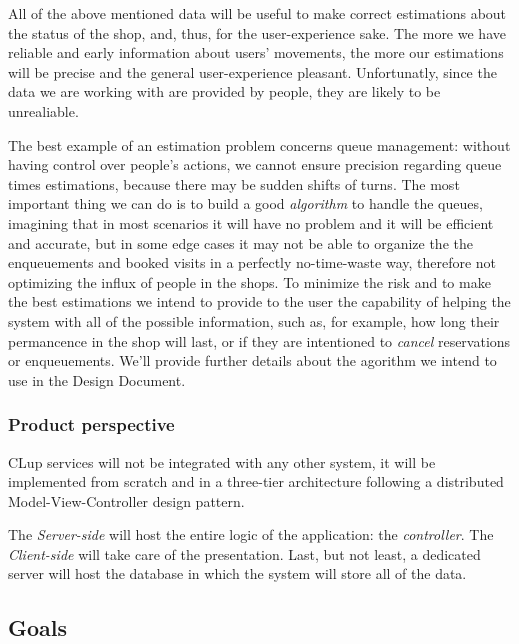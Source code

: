 \begin{itemize}[topsep=0pt]
    All of the above mentioned data will be useful to make correct estimations about the status of the shop, and, thus, for the user-experience sake. The more we have reliable and early information about users' movements, the more our estimations will be precise and the general user-experience pleasant.
    Unfortunatly, since the data we are working with are provided by people, they are likely to be unrealiable.
    
The best example of an estimation problem concerns queue management: without having control over people's actions, we cannot ensure precision regarding queue times estimations, because there may be sudden shifts of turns. The most important thing we can do is to build a good \textit{algorithm} to handle the queues, imagining that in most scenarios it will have no problem and it will be efficient and accurate, but in some edge cases it may not be able to organize the the enqueuements and booked visits in a perfectly no-time-waste way, therefore not optimizing the influx of people in the shops. To minimize the risk and to make the best estimations we intend to provide to the user the capability of helping the system with all of the possible information, such as, for example, how long their permancence in the shop will last, or if they are intentioned to \textit{cancel} reservations or enqueuements. We'll provide further details about the agorithm we intend to use in the Design Document.

\end{itemize}






\subsubsection{Product perspective}
\label{subsubsect:productperspective}

CLup services will not be integrated with any other system, it will be implemented from scratch and in a three-tier architecture following a distributed Model-View-Controller design pattern.

The \textit{Server-side} will host the entire logic of the application: the \textit{controller}. The \textit{Client-side} will take care of the presentation. Last, but not least, a dedicated server will host the database in which the system will store all of the data.

\subsection{Goals}
\label{subsect:goals}

